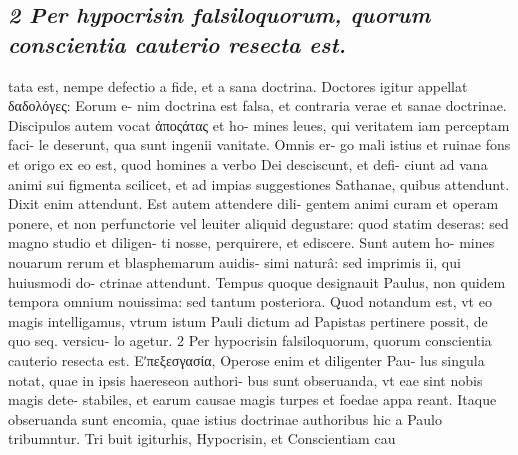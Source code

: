 \documentclass{article}
\begin{document}
\begin{pages}
\subsection*{\textit{2 Per hypocrisin falsiloquorum, quorum conscientia cauterio resecta est.}}tata est, nempe defectio a fide, et a sana doctrina. Doctores igitur appellat δαδολόγες: Eorum e- nim doctrina est falsa, et contraria verae et sanae doctrinae. Discipulos autem vocat ἀποςάτας et ho- mines leues, qui veritatem iam perceptam faci- le deserunt, qua sunt ingenii vanitate. Omnis er- go mali istius et ruinae fons et origo ex eo est, quod homines a verbo Dei desciscunt, et defi- ciunt ad vana animi sui figmenta scilicet, et ad impias suggestiones Sathanae, quibus attendunt. Dixit enim attendunt. Est autem attendere dili- gentem animi curam et operam ponere, et non perfunctorie vel leuiter aliquid degustare: quod statim deseras: sed magno studio et diligen- ti nosse, perquirere, et ediscere. Sunt autem ho- mines nouarum rerum et blasphemarum auidis- simi naturâ: sed imprimis ii, qui huiusmodi do- ctrinae attendunt. Tempus quoque designauit Paulus, non quidem tempora omnium nouissima: sed tantum posteriora. Quod notandum est, vt eo magis intelligamus, vtrum istum Pauli dictum ad Papistas pertinere possit, de quo seq. versicu- lo agetur. 2 Per hypocrisin falsiloquorum, quorum conscientia cauterio resecta est. Εʹπεξεσγασία, Operose enim et diligenter Pau- lus singula notat, quae in ipsis haereseon authori- bus sunt obseruanda, vt eae sint nobis magis dete- stabiles, et earum causae magis turpes et foedae appa reant. Itaque obseruanda sunt encomia, quae istius doctrinae authoribus hic a Paulo tribumntur. Tri buit igiturhis, Hypocrisin, et Conscientiam cau  \pend

\end{pages}
\end{document}
